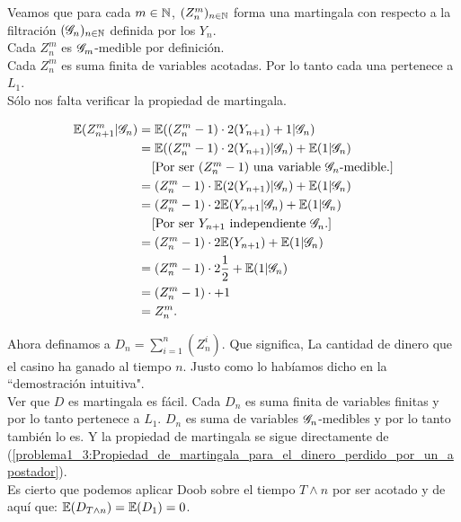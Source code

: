 	Veamos que para cada $m \in \mathbb{N}$, $(Z_n^m)_{n \in \mathbb{N}}$ forma una martingala con respecto a la filtración $(\mathscr{G}_n)_{n \in \mathbb{N}}$ 
	definida por los $Y_n$.\\
	
	Cada $Z_n^m$ es $\mathscr{G}_m$-medible por definición.\\
	
	Cada $Z_n^m$ es suma finita de variables acotadas. Por lo tanto cada una pertenece a $L_1$.\\
	
	Sólo nos falta verificar la propiedad de martingala.
	
	\begin{align}\label{problema1_3:Propiedad_de_martingala_para_el_dinero_perdido_por_un_apostador}
		\mathbb{E}(Z_{n+1}^{m} | \mathscr{G}_n) &= \mathbb{E}((Z_n^{m} - 1) \cdot 2(Y_{n+1}) + 1 | \mathscr{G}_n)\\
							   &= \mathbb{E}((Z_n^{m} -1) \cdot 2(Y_{n+1}) | \mathscr{G}_n) + \mathbb{E}( 1 | \mathscr{G}_n)\\
							   &\;\;\;\;\mbox{[Por ser $(Z_n^{m} - 1)$ una variable $\mathscr{G}_n$-medible.]}\\
							   &= (Z_n^{m} -1) \cdot \mathbb{E}(  2(Y_{n+1}) | \mathscr{G}_n) + \mathbb{E}( 1 | \mathscr{G}_n)\\
							   &= (Z_n^{m} -1) \cdot 2\mathbb{E}( Y_{n+1} | \mathscr{G}_n) + \mathbb{E}( 1 | \mathscr{G}_n)\\
							   &\;\;\;\;\mbox{[Por ser $Y_{n + 1}$ independiente $\mathscr{G}_n$.]}\\
							   &= (Z_n^{m} -1) \cdot 2\mathbb{E}( Y_{n+1}) + \mathbb{E}( 1 | \mathscr{G}_n)\\
							   &= (Z_n^{m} -1) \cdot 2 \frac{1}{2} + \mathbb{E}( 1 | \mathscr{G}_n)\\
							   &= (Z_n^{m} -1) \cdot + 1 \\
							   &= Z_n^m.
	\end{align}
	
	Ahora definamos a $D_n = \sum_{i=1}^n (Z_n^i)$. Que significa, La cantidad de dinero que el casino ha ganado al tiempo $n$. 
	Justo como lo habíamos dicho en la ``demostración intuitiva".\\
	
	Ver que $D$ es martingala es fácil. Cada $D_n$ es suma finita de variables finitas y por lo tanto pertenece a $L_1$.
	$D_n$ es suma de variables $\mathscr{G}_n$-medibles y por lo tanto también lo es. Y la propiedad de martingala se sigue directamente de
	(\ref{problema1_3:Propiedad_de_martingala_para_el_dinero_perdido_por_un_apostador}).\\
	
	Es cierto que podemos aplicar Doob sobre el tiempo $T \wedge n$ por ser acotado y de aquí que:
	$\mathbb{E}(D_{T \wedge n}) = \mathbb{E}(D_1) = 0$.\\
	
